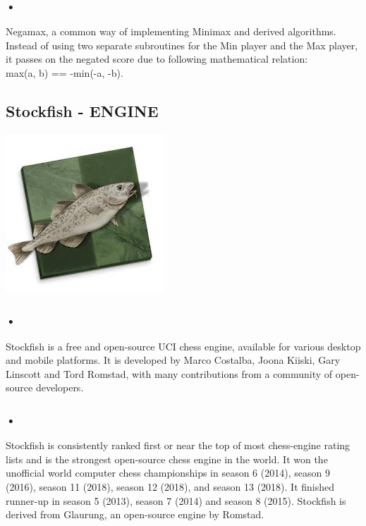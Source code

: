 \documentclass{svproc}
\begin{document}
\subsubsection{•}
Negamax, a common way of implementing Minimax and derived algorithms. Instead of using two separate subroutines for the Min player and the Max player, it passes on the negated score due to following mathematical relation: \\ max(a, b) == -min(-a, -b).

\pagebreak

\subsection{Stockfish - ENGINE}

\begin{center}
  \includegraphics[scale=0.6]{stockfish}
\end{center}

\subsubsection{•}
Stockfish is a free and open-source UCI chess engine, available for various desktop and mobile platforms. It is developed by Marco Costalba, Joona Kiiski, Gary Linscott and Tord Romstad, with many contributions from a community of open-source developers.

\subsubsection{•}
Stockfish is consistently ranked first or near the top of most chess-engine rating lists and is the strongest open-source chess engine in the world. It won the unofficial world computer chess championships in season 6 (2014), season 9 (2016), season 11 (2018), season 12 (2018), and season 13 (2018). It finished runner-up in season 5 (2013), season 7 (2014) and season 8 (2015). Stockfish is derived from Glaurung, an open-source engine by Romstad.
\end{document}
